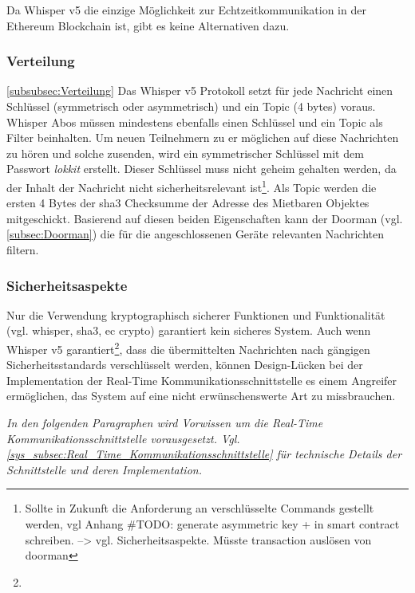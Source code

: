 Da Whisper v5 die einzige Möglichkeit zur Echtzeitkommunikation in der Ethereum Blockchain ist, gibt es keine Alternativen dazu.

\subsubsection{Verteilung}
\ref{subsubsec:Verteilung}
Das Whisper v5 Protokoll setzt für jede Nachricht einen Schlüssel (symmetrisch oder asymmetrisch) und ein Topic (4 bytes) voraus. Whisper Abos müssen mindestens ebenfalls einen Schlüssel und ein Topic als Filter beinhalten. Um neuen Teilnehmern zu er möglichen auf diese Nachrichten zu hören und solche zusenden, wird ein symmetrischer Schlüssel mit dem Passwort \emph{lokkit} erstellt. Dieser Schlüssel muss nicht geheim gehalten werden, da der Inhalt der Nachricht nicht sicherheitsrelevant ist\footnote{Sollte in Zukunft die Anforderung an verschlüsselte Commands gestellt werden, vgl Anhang \#TODO: generate asymmetric key + in smart contract schreiben. --> vgl. Sicherheitsaspekte. Müsste transaction auslösen von doorman}. Als Topic werden die ersten 4 Bytes der sha3 Checksumme der Adresse des Mietbaren Objektes mitgeschickt. Basierend auf diesen beiden Eigenschaften kann der Doorman (vgl. \ref{subsec:Doorman}) die für die angeschlossenen Geräte relevanten Nachrichten filtern.

\subsubsection{Sicherheitsaspekte}
\label{subsubsec:Sicherheitsaspekte}
Nur die Verwendung kryptographisch sicherer Funktionen und Funktionalität (vgl. whisper, sha3, ec crypto) garantiert kein sicheres System. Auch wenn Whisper v5 garantiert\footnote{}, dass die übermittelten Nachrichten nach gängigen Sicherheitsstandards verschlüsselt werden, können Design-Lücken bei der Implementation der Real-Time Kommunikationsschnittstelle es einem Angreifer ermöglichen, das System auf eine nicht erwünschenswerte Art zu missbrauchen.

\emph{In den folgenden Paragraphen wird Vorwissen um die Real-Time Kommunikationsschnittstelle vorausgesetzt. Vgl. \ref{sys_subsec:Real_Time_Kommunikationsschnittstelle} für technische Details der Schnittstelle und deren Implementation.}

